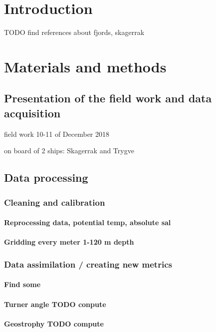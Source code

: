 \documentclass[12pt,a4paper]{article}
\begin{document}
\newpage

\section{\label{sec_intro}Introduction}

TODO find references about fjords, skagerrak

\section{Materials and methods}
\subsection{Presentation of the field work and data acquisition}

field work 10-11 of December 2018

on board of 2 ships: Skagerrak and Trygve

\subsection{Data processing}
\subsubsection{Cleaning and calibration}
\paragraph{Reprocessing data, potential temp, absolute sal}
\paragraph{Gridding every meter 1-120 m depth}

\subsubsection{Data assimilation / creating new metrics}
\paragraph{Find some}
\paragraph{Turner angle TODO conpute}
\paragraph{Geostrophy TODO compute}
\end{document}
